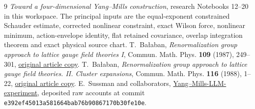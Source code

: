 \begin{thebibliography}{9}
\emph{Toward a four-dimensional Yang--Mills construction},
research Notebooks 12--20 in this workspace.
The principal inputs are the equal-exponent constrained
Schauder estimate, corrected nonlinear constraint, exact
Wilson force, nonlinear minimum, action-envelope identity,
flat retained covariance, overlap integration theorem and
exact physical source chart.
T.~Ba\l aban,
\emph{Renormalization group approach to lattice gauge field
theories I}, Commun. Math. Phys. \textbf{109} (1987), 249--301,
\href{https://scispace.com/pdf/renormalization-group-approach-to-lattice-gauge-field-3ygai0vxt1.pdf}{original article copy}.
T.~Ba\l aban,
\emph{Renormalization group approach to lattice gauge field
theories. II. Cluster expansions},
Commun. Math. Phys. \textbf{116} (1988), 1--22,
\href{https://scispace.com/pdf/renormalization-group-approach-to-lattice-gauge-field-4penm4k7hc.pdf}{original article copy}.
E.~Sussman and collaborators,
\href{https://github.com/ethanwsussman/Yang--Mills-LLM-experiment}{Yang--Mills-LLM-experiment},
deposited raw accounts at commit
\texttt{e392ef45013a581664bab76b90867170b30fe10e}.
\end{thebibliography}

